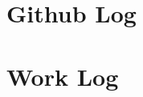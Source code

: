 \documentclass[letterpaper,10pt,titlepage]{IEEEtran}
\begin{document}
 \section{Github Log}
 	
    
\section{Work Log}
	
    
\nocite{*}%



\end{document}
